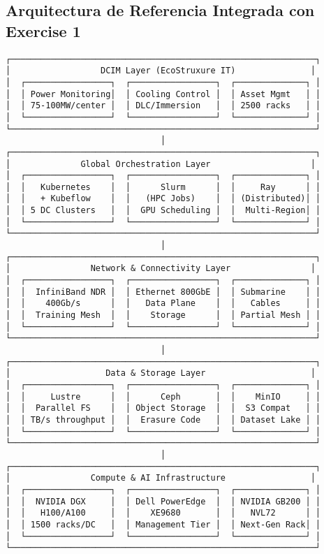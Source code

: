 \documentclass[12pt,a4paper]{article}
\begin{document}
\subsection{Arquitectura de Referencia Integrada con Exercise 1}

\begin{verbatim}
┌─────────────────────────────────────────────────────────────┐
│                  DCIM Layer (EcoStruxure IT)               │
│  ┌─────────────────┐  ┌─────────────────┐  ┌──────────────┐ │
│  │ Power Monitoring│  │ Cooling Control │  │ Asset Mgmt   │ │
│  │ 75-100MW/center │  │ DLC/Immersion   │  │ 2500 racks   │ │
│  └─────────────────┘  └─────────────────┘  └──────────────┘ │
└─────────────────────────────────────────────────────────────┘
                               │
┌─────────────────────────────────────────────────────────────┐
│              Global Orchestration Layer                    │
│  ┌─────────────────┐  ┌─────────────────┐  ┌──────────────┐ │
│  │   Kubernetes    │  │      Slurm      │  │     Ray      │ │
│  │   + Kubeflow    │  │   (HPC Jobs)    │  │ (Distributed)│ │
│  │ 5 DC Clusters   │  │  GPU Scheduling │  │  Multi-Region│ │
│  └─────────────────┘  └─────────────────┘  └──────────────┘ │
└─────────────────────────────────────────────────────────────┘
                               │
┌─────────────────────────────────────────────────────────────┐
│                Network & Connectivity Layer                │
│  ┌─────────────────┐  ┌─────────────────┐  ┌──────────────┐ │
│  │  InfiniBand NDR │  │ Ethernet 800GbE │  │ Submarine    │ │
│  │    400Gb/s      │  │   Data Plane    │  │   Cables     │ │
│  │  Training Mesh  │  │    Storage      │  │ Partial Mesh │ │
│  └─────────────────┘  └─────────────────┘  └──────────────┘ │
└─────────────────────────────────────────────────────────────┘
                               │
┌─────────────────────────────────────────────────────────────┐
│                   Data & Storage Layer                     │
│  ┌─────────────────┐  ┌─────────────────┐  ┌──────────────┐ │
│  │     Lustre      │  │      Ceph       │  │    MinIO     │ │
│  │  Parallel FS    │  │ Object Storage  │  │  S3 Compat   │ │
│  │ TB/s throughput │  │  Erasure Code   │  │ Dataset Lake │ │
│  └─────────────────┘  └─────────────────┘  └──────────────┘ │
└─────────────────────────────────────────────────────────────┘
                               │
┌─────────────────────────────────────────────────────────────┐
│                Compute & AI Infrastructure                 │
│  ┌─────────────────┐  ┌─────────────────┐  ┌──────────────┐ │
│  │  NVIDIA DGX     │  │ Dell PowerEdge  │  │ NVIDIA GB200 │ │
│  │   H100/A100     │  │    XE9680       │  │   NVL72      │ │
│  │ 1500 racks/DC   │  │ Management Tier │  │ Next-Gen Rack│ │
│  └─────────────────┘  └─────────────────┘  └──────────────┘ │
└─────────────────────────────────────────────────────────────┘
\end{verbatim}
\end{document}
